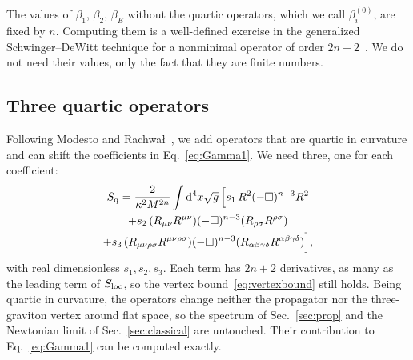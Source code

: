 \documentclass[a4paper,11pt]{article}
\newcommand{\dd}{\mathrm{d}}
\begin{document}
The values of $\beta_1$, $\beta_2$, $\beta_E$ without the quartic operators, which we call $\beta_i^{(0)}$, are fixed by $n$. Computing them is a well-defined exercise in the generalized Schwinger--DeWitt technique for a nonminimal operator of order $2n+2$~\cite{BarvinskyVilkovisky1985}. We do not need their values, only the fact that they are finite numbers.

\subsection{Three quartic operators}
\label{sec:killers}

Following Modesto and Rachwa{\l}~\cite{ModestoRachwal2014}, we add operators that are quartic in curvature and can shift the coefficients in Eq.~\eqref{eq:Gamma1}. We need three, one for each coefficient:
\begin{multline}
\label{eq:killers}
S_{\rm q}=\frac{2}{\kappa^2M^{2n}}\int\dd^4x\sqrt g\,\Bigl[s_1\,R^2(-\Box)^{n-3}R^2\\
+s_2\,(R_{\mu\nu}R^{\mu\nu})(-\Box)^{n-3}(R_{\rho\sigma}R^{\rho\sigma})\\
+s_3\,(R_{\mu\nu\rho\sigma}R^{\mu\nu\rho\sigma})(-\Box)^{n-3}(R_{\alpha\beta\gamma\delta}R^{\alpha\beta\gamma\delta})\Bigr],
\end{multline}
with real dimensionless $s_1,s_2,s_3$. Each term has $2n+2$ derivatives, as many as the leading term of $S_{\rm loc}$, so the vertex bound~\eqref{eq:vertexbound} still holds. Being quartic in curvature, the operators change neither the propagator nor the three-graviton vertex around flat space, so the spectrum of Sec.~\ref{sec:prop} and the Newtonian limit of Sec.~\ref{sec:classical} are untouched. Their contribution to Eq.~\eqref{eq:Gamma1} can be computed exactly.
\end{document}
